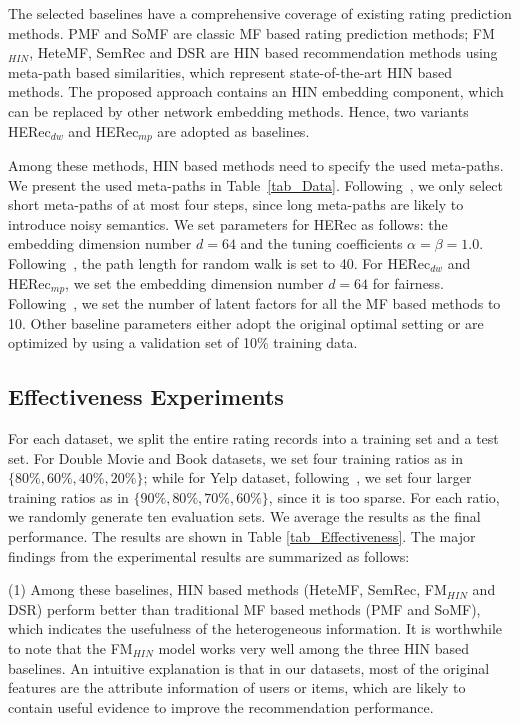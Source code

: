 The selected baselines have a comprehensive coverage of existing rating prediction methods. PMF and SoMF are classic MF based rating prediction methods; FM$_{HIN}$, HeteMF, SemRec and DSR are HIN based recommendation methods using meta-path based similarities, which represent state-of-the-art HIN based methods. The proposed approach contains an HIN embedding component, which can be replaced by other network embedding methods. Hence, two variants HERec$_{dw}$ and HERec$_{mp}$
are adopted as baselines.



Among these methods, HIN based methods need to specify the used meta-paths. We present the used meta-paths  in Table~\ref{tab_Data}.
Following~\cite{sun2011pathsim}, we only select short meta-paths of at most four steps, since long meta-paths are likely to introduce noisy semantics.
We set parameters for HERec as follows: the embedding dimension number $d = 64$ and the tuning coefficients $\alpha = \beta = 1.0$.
Following~\cite{perozzi2014deepwalk}, the path length for random walk is set to 40.
For HERec$_{dw}$ and HERec$_{mp}$, we set the embedding dimension number $d = 64$ for fairness.
Following~\cite{shi2016integrating,zheng2017recommendation}, we set the number of latent factors for all the MF based methods to 10.
Other baseline parameters either adopt the original optimal setting or are optimized by using a validation set of 10\% training data.


\subsection{Effectiveness Experiments}
For each dataset, we split the entire rating records into a training set and a test set. %
For Double Movie and Book datasets, we set four training ratios as in $\{80\%, 60\%, 40\%, 20\%\}$; while for Yelp dataset, following~\cite{shi2015semantic}, we set four larger training ratios as in $\{90\%, 80\%, 70\%, 60\%\}$, since
it is too sparse. For each ratio, we randomly generate ten evaluation sets. We average the  results as the final performance.
The results are shown in Table \ref{tab_Effectiveness}. The major findings from the experimental results are summarized as follows:

(1) Among these baselines, HIN based methods (HeteMF, SemRec, FM$_{HIN}$ and DSR) perform better than traditional MF based methods (PMF and SoMF), which indicates the usefulness of the heterogeneous information. It is worthwhile to note that the FM$_{HIN}$ model works very well among the three HIN based baselines. An intuitive explanation is that in our datasets, most of the original features are the attribute information of users or items, which are likely to contain useful evidence to improve the recommendation performance.

